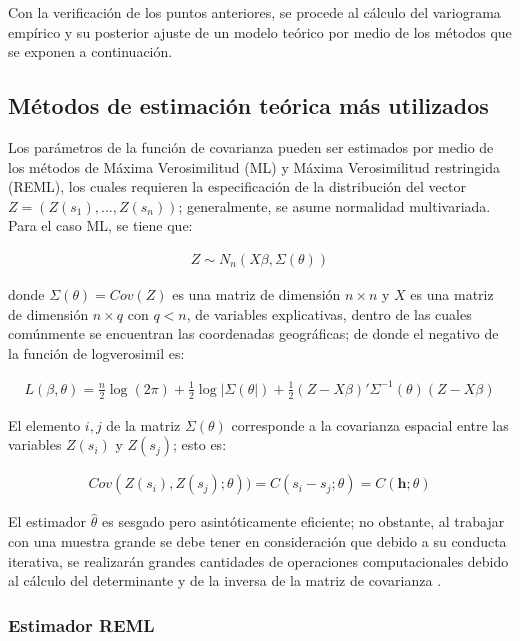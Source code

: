 \documentclass[
]{book}
\begin{document}
Con la verificación de los puntos anteriores, se procede al cálculo del variograma empírico y su posterior ajuste de un modelo teórico por medio de los métodos que se exponen a continuación.

\hypertarget{muxe9todos-de-estimaciuxf3n-teuxf3rica-muxe1s-utilizados}{%
\subsection{Métodos de estimación teórica más utilizados}\label{muxe9todos-de-estimaciuxf3n-teuxf3rica-muxe1s-utilizados}}

Los parámetros de la función de covarianza pueden ser estimados por medio de los métodos de Máxima Verosimilitud (ML) y Máxima Verosimilitud restringida (REML), los cuales requieren la especificación de la distribución del vector \(Z=(Z(s_1),...,Z(s_n))\); generalmente, se asume normalidad multivariada. Para el caso ML, se tiene que:

\begin{align}
  Z\sim N_n(X\beta,\Sigma(\theta))  
\end{align}

donde \(\Sigma(\theta)=Cov(Z)\) es una matriz de dimensión \(n \times n\) y \(X\) es una matriz de dimensión \(n\times q\) con \(q<n\), de variables explicativas, dentro de las cuales comúnmente se encuentran las coordenadas geográficas; de donde el negativo de la función de logverosimil es:

\begin{align}
   L(\beta,\theta)=\frac{n}{2}\log(2\pi)+\frac{1}{2} \log|\Sigma(\theta|)+\frac{1}{2}(Z-X\beta)'\Sigma^{-1}(\theta)(Z-X\beta) 
\end{align}

El elemento \(i,j\) de la matriz \(\Sigma(\theta)\) corresponde a la covarianza espacial entre las variables \(Z(s_i)\) y \(Z(s_j)\); esto es:

\begin{align}
  Cov(Z(s_i),Z(s_j);\theta))=C(s_i-s_j;\theta)=C(\textbf{h};\theta)  
\end{align}

El estimador \(\hat{\theta}\) es sesgado pero asintóticamente eficiente; no obstante, al trabajar con una muestra grande se debe tener en consideración que debido a su conducta iterativa, se realizarán grandes cantidades de operaciones computacionales debido al cálculo del determinante y de la inversa de la matriz de covarianza \citep{marta}.

\hypertarget{estimador-reml}{%
\subsubsection*{Estimador REML}\label{estimador-reml}}
\end{document}
